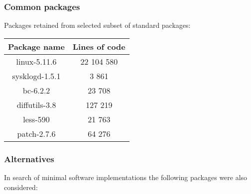 \subsubsection{Common packages}

Packages retained from selected subset of standard packages:

\begin{center}
    \begin{tabular}{|c||c|}
        \hline
        Package name & Lines of code \\
        \hline
        \hline
        linux-5.11.6 & 22 104 580 \\
        \hline
        sysklogd-1.5.1 & 3 861 \\
        \hline
        bc-6.2.2 & 23 708 \\
        \hline        
        diffutils-3.8 & 127 219 \\
        \hline
        less-590 & 21 763 \\
        \hline
        patch-2.7.6 & 64 276 \\
        \hline
    \end{tabular}
\end{center}

\subsubsection{Alternatives}

In search of minimal software implementations the following packages were also considered:

